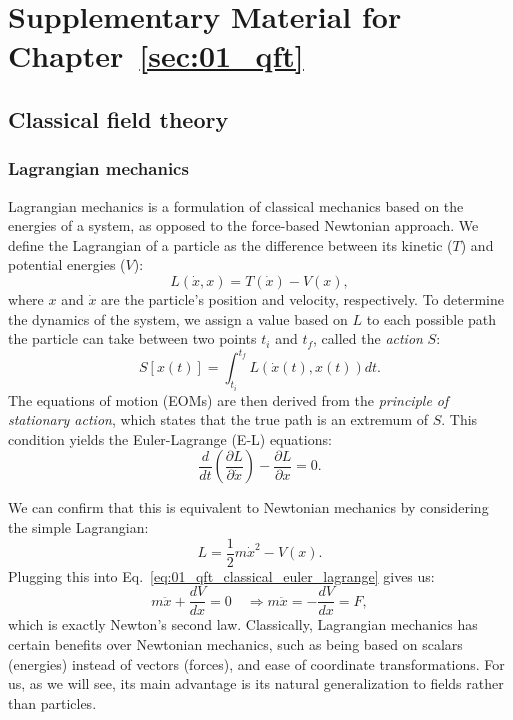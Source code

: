 \chapter{Supplementary Material for Chapter~\ref{sec:01_qft}}
\label{app:01_qft}

\section{Classical field theory}
\label{app:01_qft_classical}

\subsection{Lagrangian mechanics}
\label{sec:01_qft_classical_lagrangian}

Lagrangian mechanics is a formulation of classical mechanics based on the energies of a system, as opposed to the force-based Newtonian approach.
We define the Lagrangian of a particle as the difference between its kinetic ($T$) and potential energies ($V$):
\begin{equation}
	\label{eq:01_qft_classical_lagrangian}
	L(\dot x, x) = T(\dot x) - V(x),
\end{equation}
where $x$ and $\dot x$ are the particle's position and velocity, respectively.
To determine the dynamics of the system, we assign a value based on $L$ to each possible path the particle can take between two points $t_i$ and $t_f$, called the \textit{action} $S$:
\begin{equation}
	\label{eq:01_qft_classical_action}
	S[x(t)] = \int_{t_i}^{t_f} L(\dot x(t), x(t)) dt.
\end{equation}
The equations of motion (EOMs) are then derived from the \textit{principle of stationary action}, which states that the true path is an extremum of $S$.
This condition yields the Euler-Lagrange (E-L) equations:
\begin{equation}
	\label{eq:01_qft_classical_euler_lagrange}
	\frac{d}{dt}\left(\frac{\partial L}{\partial \dot x}\right) - \frac{\partial L}{\partial x} = 0.
\end{equation}

\begin{example}
\label{ex:01_qft_lagrangian_classical_newton}
We can confirm that this is equivalent to Newtonian mechanics by considering the simple Lagrangian:
\begin{equation}
\label{eq:01_qft_classical_lagrangian_newton}
L = \frac{1}{2}m\dot x^2 - V(x).
\end{equation}
Plugging this into Eq.~\ref{eq:01_qft_classical_euler_lagrange} gives us:
\begin{equation}
	\label{eq:01_qft_classical_euler_lagrange_newton}
	m\ddot x + \frac{d V}{d x} = 0 \quad\Rightarrow m\ddot x = -\frac{d V}{d x} = F,
\end{equation}
which is exactly Newton's second law.
Classically, Lagrangian mechanics has certain benefits over Newtonian mechanics, such as being based on scalars (energies) instead of vectors (forces), and ease of coordinate transformations.
For us, as we will see, its main advantage is its natural generalization to fields rather than particles.
\end{example}


